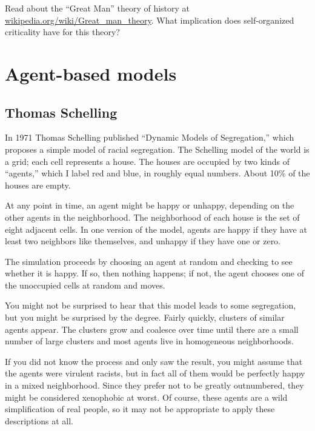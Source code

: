 \documentclass[10pt]{book}
\begin{document}
\begin{ex}

Read about the ``Great Man'' theory of history at
\url{wikipedia.org/wiki/Great_man_theory}.  What implication
does self-organized criticality have for this theory?

\end{ex}


\chapter{Agent-based models}

\section{Thomas Schelling}

In 1971 Thomas Schelling published ``Dynamic Models of Segregation,''
which proposes a simple model of racial segregation.  The Schelling
model of the world is a grid; each cell represents a
house.  The houses are occupied by two kinds of ``agents,'' which I
label red and blue, in roughly equal numbers.  About 10\% of the
houses are empty.

At any point in time, an agent might be happy or unhappy, depending
on the other agents in the neighborhood.
The neighborhood of each house is the set of
eight adjacent cells.
In one version of the model, agents are happy if they have at least
two neighbors like themselves, and unhappy if they have one or zero.

The simulation proceeds by choosing an agent at random and checking
to see whether it is happy.  If so, then nothing happens; if not,
the agent chooses one of the unoccupied cells at
random and moves.

You might not be surprised to hear that this model leads to some
segregation, but you might be surprised by the degree.  Fairly
quickly, clusters of similar agents appear.  The clusters
grow and coalesce over time until there are a small number
of large clusters and most agents live in homogeneous
neighborhoods.

If you did not know the process and only saw the result, you might
assume that the agents were virulent racists, but in fact all of them
would be perfectly happy in a mixed neighborhood.  Since they prefer
not to be greatly outnumbered, they might be considered xenophobic at
worst.  Of course, these agents are a wild simplification of real
people, so it may not be appropriate to apply these descriptions at
all.
\end{document}

